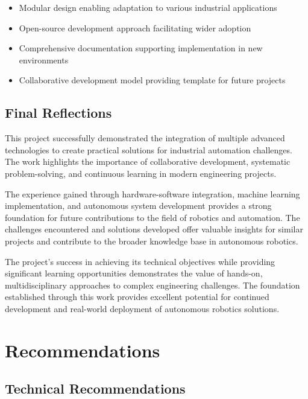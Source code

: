 \documentclass{book}
\begin{document}
\begin{itemize}
\item Modular design enabling adaptation to various industrial applications
\item Open-source development approach facilitating wider adoption
\item Comprehensive documentation supporting implementation in new environments
\item Collaborative development model providing template for future projects
\end{itemize}

\section{Final Reflections}

\par\noindent This project successfully demonstrated the integration of multiple advanced technologies to create practical solutions for industrial automation challenges. The work highlights the importance of collaborative development, systematic problem-solving, and continuous learning in modern engineering projects.

\par\noindent The experience gained through hardware-software integration, machine learning implementation, and autonomous system development provides a strong foundation for future contributions to the field of robotics and automation. The challenges encountered and solutions developed offer valuable insights for similar projects and contribute to the broader knowledge base in autonomous robotics.

\par\noindent The project's success in achieving its technical objectives while providing significant learning opportunities demonstrates the value of hands-on, multidisciplinary approaches to complex engineering challenges. The foundation established through this work provides excellent potential for continued development and real-world deployment of autonomous robotics solutions.

\chapter{Recommendations}

\section{Technical Recommendations}
\end{document}
